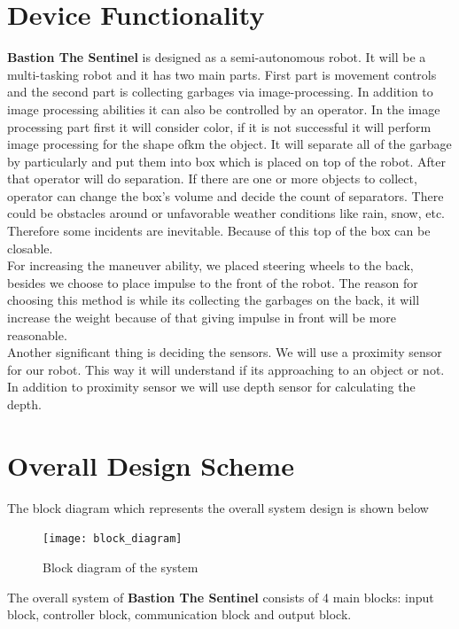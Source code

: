 \documentclass[12pt,a4paper]{article}
\begin{document}
\section{Device Functionality}
 \begin{flushleft}
  \textbf{Bastion The Sentinel} is designed as a semi-autonomous robot. It will be a multi-tasking robot and it has two 
  main parts. First part is movement controls and the second part is collecting garbages via image-processing. In addition to 
  image processing abilities it can also be controlled by an operator. In the image processing part first it will consider color, 
  if it is not successful it will perform image processing for the shape ofkm the object. It will separate 
  all of the garbage by particularly and put them into box which is placed on top of the robot. After that operator will do separation.  
  If there are one or more objects to collect, operator can change the box's volume and decide the count of separators.
  There could be obstacles around or unfavorable weather conditions like rain, snow, etc. Therefore some incidents are 
  inevitable. Because of this top of the box can be closable. \\
  For increasing the maneuver ability, we placed steering wheels to the back, besides we choose to place impulse to the front of 
  the robot. The reason for choosing this method is while its collecting the garbages on the back, it will increase the weight because 
  of that giving impulse in front will be more reasonable. \\
  Another significant thing is deciding the sensors. We will use a proximity sensor for our robot. This way it will 
  understand if its approaching to an object or not. In addition to proximity sensor we will use depth sensor for calculating the depth. 
 \end{flushleft}
 
 \pagebreak
 \section{Overall Design Scheme}
 \begin{flushleft}
  The block diagram which represents the overall system design is shown below\\
  \begin{figure}[h]
   \begin{center}
    \texttt{[image: block\_diagram]}
    \caption{Block diagram of the system}
   \end{center}
  \end{figure}
  The overall system of \textbf{Bastion The Sentinel} consists of 4 main blocks: input block, controller block, 
  communication block and output block.
 \end{flushleft}
 
\end{document}
